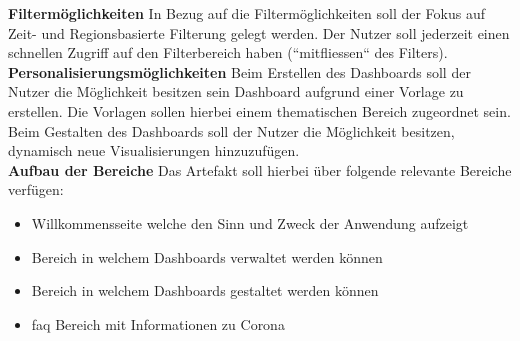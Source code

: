 \clearpage
\noindent
\textbf{Filtermöglichkeiten}
\newline
\indent
In Bezug auf die Filtermöglichkeiten soll der Fokus auf Zeit- und Regionsbasierte Filterung gelegt werden. Der Nutzer soll jederzeit einen schnellen Zugriff auf den Filterbereich haben (``mitfliessen`` des Filters).\\

\noindent
\textbf{Personalisierungsmöglichkeiten}
\newline
\indent
Beim Erstellen des Dashboards soll der Nutzer die Möglichkeit besitzen sein Dashboard aufgrund einer Vorlage zu erstellen. Die Vorlagen sollen hierbei einem thematischen Bereich zugeordnet sein. Beim Gestalten des Dashboards soll der Nutzer die Möglichkeit besitzen, dynamisch neue Visualisierungen hinzuzufügen.\\

\noindent
\textbf{Aufbau der Bereiche}
\newline
\indent
Das Artefakt soll hierbei über folgende relevante Bereiche verfügen:
\begin{itemize}
    \item Willkommensseite welche den Sinn und Zweck der Anwendung aufzeigt
    \item Bereich in welchem Dashboards verwaltet werden können
    \item Bereich in welchem Dashboards gestaltet werden können
    \item \gls{faq} Bereich mit Informationen zu Corona
\end{itemize}
